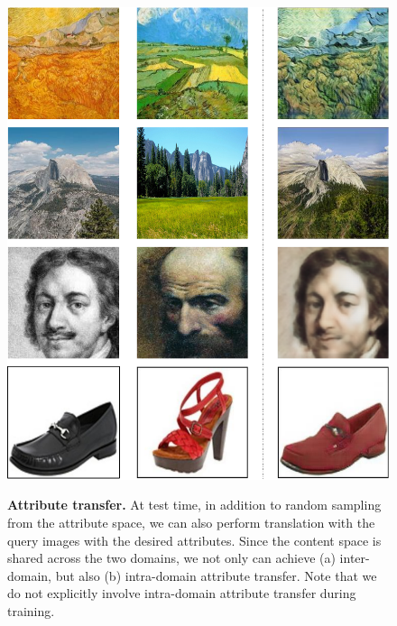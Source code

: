 \documentclass[runningheads]{llncs}
\begin{document}
\begin{figure}[t]
{{		\includegraphics[width=\linewidth]{Figures/ContentAttribute_Same2.pdf}%
	   }
    }
	\caption{\textbf{Attribute transfer.} At test time, in addition to random sampling from the attribute space, we can also perform translation with the query images with the desired attributes. Since the content space is shared across the two domains, we not only can achieve (a) inter-domain, but also (b) intra-domain attribute transfer. Note that we do not explicitly involve intra-domain attribute transfer during training.
	}
	\label{figure:cross}
    \vspace{\figmargin}
\end{figure}
\end{document}
